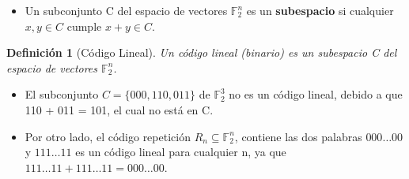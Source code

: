 \documentclass{beamer}
\theoremstyle{plain}
\newtheorem{definicion} [Definicion]{Definición}
\theoremstyle{example}
\theoremstyle{example}
\begin{document}
\begin{frame}  \small  

\begin{itemize} 
\item Un subconjunto C del espacio de vectores $\mathbb{F}^n_2$ es un \textbf{subespacio} si cualquier $x, y \in C$ cumple $x+y \in C$.
\end{itemize}

\begin{definicion}[Código Lineal]
Un código lineal (binario) es un subespacio C del espacio de vectores $\mathbb{F}^n_2$.
\end{definicion}

\begin{itemize} 

\item  El subconjunto $C = \{000,110,011\}$ de  $\mathbb{F}^3_2$ no es un código lineal, debido a que 110 + 011 = 101, el cual no está en C.


\item Por otro lado, el código repetición $R_n \subseteq \mathbb{F}^n_2$, contiene las dos palabras $000 \ldots 00$ y $111 \ldots 11$ es un código lineal para cualquier n, ya que $111 \ldots 11 + 111 \ldots 11 = 000 \ldots 00$. 


\end{itemize} \end{frame} 
\end{document}
